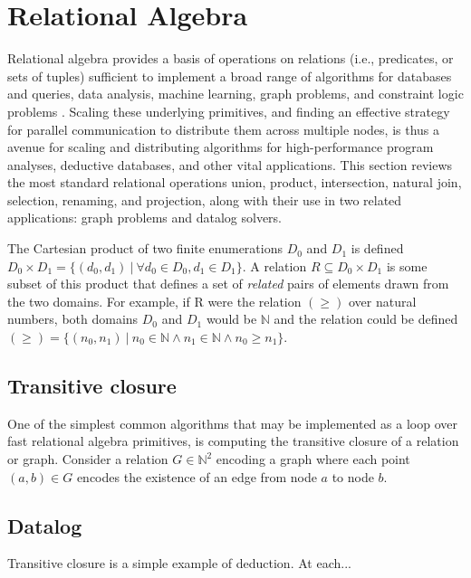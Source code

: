 

\section{Relational Algebra}
\label{sec:ra}
%
Relational algebra provides a basis of operations on relations (i.e., predicates, or sets of tuples) sufficient to implement a broad range of algorithms for databases and queries, data analysis, machine learning, graph problems, and constraint logic problems \cite{}. Scaling these underlying primitives, and finding an effective strategy for parallel communication to distribute them across multiple nodes, is thus a avenue for scaling and distributing algorithms for high-performance program analyses, deductive databases, and other vital applications. This section reviews the most standard relational operations union, product, intersection, natural join, selection, renaming, and projection, along with their use in two related applications: graph problems and datalog solvers.

The Cartesian product of two finite enumerations $D_0$ and $D_1$ is defined $D_0 \times D_1 = \{ (d_0, d_1) \ |\ \forall d_0 \in D_0, d_1 \in D_1 \}$. A relation $R \subseteq D_0 \times D_1$ is some subset of this product that defines a set of \textit{related} pairs of elements drawn from the two domains. For example, if R were the relation $(\geq)$ over natural numbers, both domains $D_0$ and $D_1$ would be $\mathbb{N}$ and the relation could be defined $(\geq) = \{ (n_0, n_1) \ |\ n_0 \in \mathbb{N} \wedge n_1 \in \mathbb{N} \wedge n_0 \geq n_1 \}$.




\subsection{Transitive closure}
\label{sec:ra:tc}
%
One of the simplest common algorithms that may be implemented as a loop over fast relational algebra primitives, is computing the transitive closure of a relation or graph. Consider a relation $G \in \mathbb{N}^2$ encoding a graph where each point $(a,b) \in G$ encodes the existence of an edge from node $a$ to node $b$.


\subsection{Datalog}
\label{sec:ra:tc}
%
Transitive closure is a simple example of deduction. At each...


